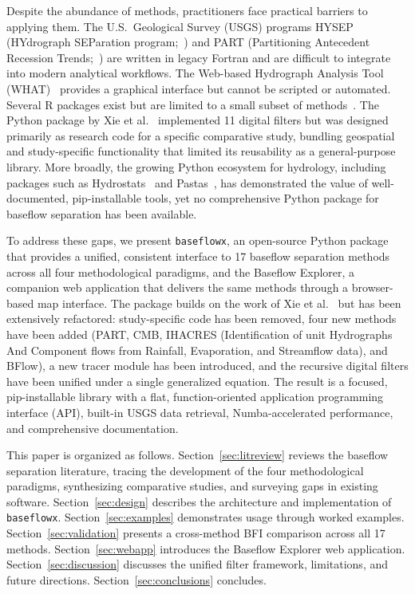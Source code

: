 \documentclass[hydrology,article,submit,pdftex,moreauthors]{Definitions/mdpi}
\begin{document}
Despite the abundance of methods, practitioners face practical barriers to applying them. The U.S.\ Geological Survey (USGS) programs HYSEP (HYdrograph SEParation program;~\cite{Sloto1996}) and PART (Partitioning Antecedent Recession Trends;~\cite{Rutledge1998}) are written in legacy Fortran and are difficult to integrate into modern analytical workflows. The Web-based Hydrograph Analysis Tool (WHAT)~\cite{Lim2005} provides a graphical interface but cannot be scripted or automated. Several R packages exist but are limited to a small subset of methods~\cite{PelletierR2020}. The Python package by Xie et al.~\cite{Xie2020} implemented 11 digital filters but was designed primarily as research code for a specific comparative study, bundling geospatial and study-specific functionality that limited its reusability as a general-purpose library. More broadly, the growing Python ecosystem for hydrology, including packages such as Hydrostats~\cite{Roberts2018} and Pastas~\cite{Collenteur2019}, has demonstrated the value of well-documented, pip-installable tools, yet no comprehensive Python package for baseflow separation has been available.

To address these gaps, we present \texttt{baseflowx}, an open-source Python package that provides a unified, consistent interface to 17 baseflow separation methods across all four methodological paradigms, and the Baseflow Explorer, a companion web application that delivers the same methods through a browser-based map interface. The package builds on the work of Xie et al.~\cite{Xie2020} but has been extensively refactored: study-specific code has been removed, four new methods have been added (PART, CMB, IHACRES (Identification of unit Hydrographs And Component flows from Rainfall, Evaporation, and Streamflow data), and BFlow), a new tracer module has been introduced, and the recursive digital filters have been unified under a single generalized equation. The result is a focused, pip-installable library with a flat, function-oriented application programming interface (API), built-in USGS data retrieval, Numba-accelerated performance, and comprehensive documentation.

This paper is organized as follows. Section~\ref{sec:litreview} reviews the baseflow separation literature, tracing the development of the four methodological paradigms, synthesizing comparative studies, and surveying gaps in existing software. Section~\ref{sec:design} describes the architecture and implementation of \texttt{baseflowx}. Section~\ref{sec:examples} demonstrates usage through worked examples. Section~\ref{sec:validation} presents a cross-method BFI comparison across all 17 methods. Section~\ref{sec:webapp} introduces the Baseflow Explorer web application. Section~\ref{sec:discussion} discusses the unified filter framework, limitations, and future directions. Section~\ref{sec:conclusions} concludes.
\end{document}
